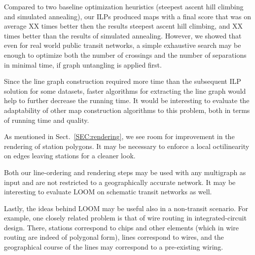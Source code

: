 \documentclass[format=acmsmall, review=false, screen=true]{acmart}
\begin{document}
Compared to two baseline optimization heuristics (steepest ascent hill climbing and simulated annealing), our ILPs produced maps with a final score that was on average XX times better then the results steepest ascent hill climbing, and XX times better than the results of simulated annealing.
However, we showed that even for real world public transit networks, a simple exhaustive search may be enough to optimize both the number of crossings and the number of separations in minimal time, if graph untangling is applied first.

Since the line graph construction required more time than the subsequent ILP solution for some datasets, faster algorithms for extracting the line graph would help to further decrease the running time.
It would be interesting to evaluate the adaptability of other map construction algorithms to this problem, both in terms of running time and quality.

As mentioned in Sect.~\ref{SEC:rendering}, we see room for improvement in the rendering of station polygons.
It may be necessary to enforce a local octilinearity on edges leaving stations for a cleaner look. 

Both our line-ordering and rendering steps may be used with any multigraph as input and are not restricted to a geographically accurate network.
It may be interesting to evaluate LOOM on schematic transit networks as well.

Lastly, the ideas behind LOOM may be useful also in a non-transit scenario.
For example, one closely related problem is that of wire routing in integrated-circuit design.
There, stations correspond to chips and other elements (which in wire routing are indeed of polygonal form), lines correspond to wires, and the geographical course of the lines may correspond to a pre-existing wiring.



\end{document}

